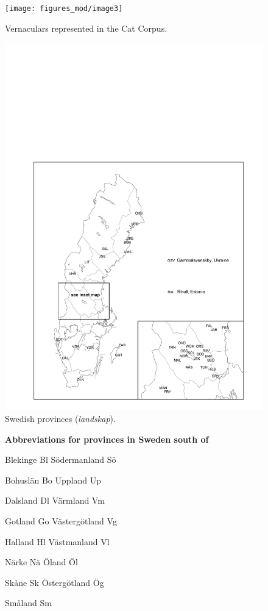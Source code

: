 \begin{figure}[h]

\texttt{[image: figures\_mod/image3]}
\caption{Vernaculars represented in the Cat Corpus.}
\label{map:3}

\end{figure}

\begin{figure}[h]

\includegraphics{figures_mod/image4}
\caption{Swedish provinces (\textit{landskap}).}
\label{map:4}

\end{figure}

\begin{figure}[h]

\textbf{Abbreviations for provinces in Sweden south of}

Blekinge  Bl  Södermanland  Sö

Bohuslän  Bo  Uppland  Up

Dalsland  Dl  Värmland  Vm

Gotland  Go  Västergötland  Vg

Halland  Hl  Västmanland  Vl

Närke  Nä  Öland  Öl

Skåne  Sk  Östergötland  Ög

Småland  Sm    

\end{figure}

